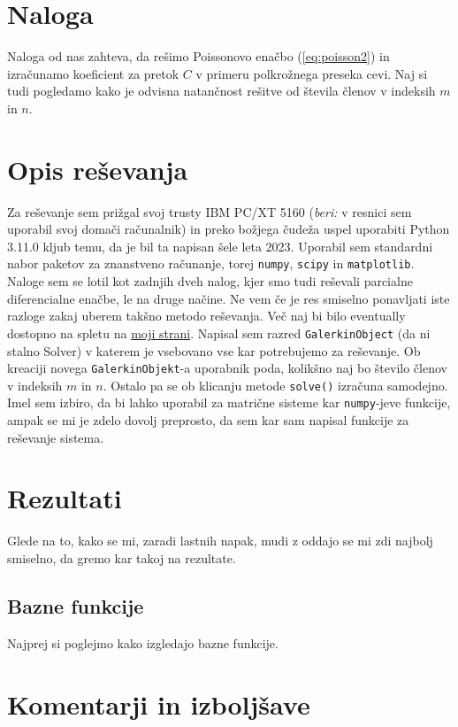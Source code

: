 \documentclass[a4paper]{article}
\begin{document}
\section{Naloga}
Naloga od nas zahteva, da rešimo Poissonovo enačbo (\ref{eq:poisson2}) in izračunamo koeficient za 
pretok $C$ v primeru polkrožnega preseka cevi. Naj si tudi pogledamo kako je odvisna natančnost
rešitve od števila členov v indeksih $m$ in $n$.\\
\section{Opis reševanja}
Za reševanje sem prižgal svoj trusty IBM PC/XT 5160 (\textit{beri:} v resnici sem uporabil svoj domači računalnik) in 
preko božjega čudeža uspel uporabiti Python 3.11.0 kljub temu, da je bil ta napisan šele leta 2023. Uporabil sem 
standardni nabor paketov za znanstveno računanje, torej \texttt{numpy}, \texttt{scipy} in \texttt{matplotlib}.\\

Naloge sem se lotil kot zadnjih dveh nalog, kjer smo tudi reševali parcialne diferencialne enačbe, le na druge 
načine. Ne vem če je res smiselno ponavljati iste razloge zakaj uberem takšno metodo reševanja. Več naj bi bilo eventually
dostopno na spletu na \href{https://pengu5055.github.io/}{moji strani}. Napisal sem razred \texttt{GalerkinObject} 
(da ni stalno Solver) v katerem je vsebovano vse kar potrebujemo za reševanje. Ob kreaciji novega \texttt{GalerkinObjekt}-a 
uporabnik poda, kolikšno naj bo število členov v indeksih $m$ in $n$. Ostalo pa se ob klicanju metode \texttt{solve()} 
izračuna samodejno. Imel sem izbiro, da bi lahko uporabil za matrične sisteme kar \texttt{numpy}-jeve funkcije, 
ampak se mi je zdelo dovolj preprosto, da sem kar sam napisal funkcije za reševanje sistema.

\section{Rezultati}
Glede na to, kako se mi, zaradi lastnih napak, mudi z oddajo se mi zdi najbolj smiselno, da gremo kar takoj na rezultate.

\subsection{Bazne funkcije}
Najprej si poglejmo kako izgledajo bazne funkcije. 


\section{Komentarji in izboljšave}


\newpage


\end{document}
